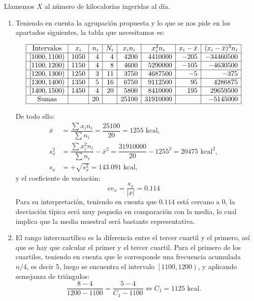 {Llamemos $X$ al número de kilocalorías ingeridas al día.
\begin{enumerate}
\item Teniendo en cuenta la agrupación propuesta y lo que se nos pide en los apartados siguientes, la tabla que necesitamos es:

\[
\begin{array}{|c|r|r|r|r|r|r|r|} \hline
\textrm{Intervalos} & \multicolumn{1}{c|}{x_{i}} & \multicolumn{1}{c|}{n_{i}} &
\multicolumn{1}{c|}{N_{i}} & \multicolumn{1}{c|}{x_{i}n_{i}} &
\multicolumn{1}{c|}{x_{i}^{2}n_{i}} & \multicolumn{1}{c|}{x_{i}-\bar x} &
\multicolumn{1}{c|}{(x_{i}- \bar x)^3n_{i}}
\\ \hline
\left[ 1000,1100\right)  & 1050 & 4 & 4 & 4200 &  4410000 & -205 & -34460500
\\ \hline
\left[ 1100,1200\right)  & 1150 & 4 & 8 & 4600 & 5290000 & -105 & -4630500
\\ \hline
\left[ 1200,1300\right)  & 1250 & 3 & 11 & 3750 & 4687500 & -5 & -375
\\ \hline
\left[ 1300,1400\right)  & 1350 & 5 & 16 & 6750 &  9112500 & 95 & 4286875
\\ \hline
\left[ 1400,1500\right)  & 1450 & 4 & 20 & 5800 &  8410000 & 195 & 29659500
\\ \hline
\textrm{Sumas}&  & 20 &  & 25100 &  31910000 & & -5145000
\\ \hline
\end{array}
\]

De todo ello:
\begin{align*}
\bar x& =\dfrac{\sum x_{i}n_{i}}{\sum n_{i}}=\dfrac{25100}{20}=1255\text{ kcal},\\
s_{x}^{2}& =\dfrac{\sum x_{i}^{2}n_{i}}{\sum n_{i}}-\bar x^{2}=\dfrac{31910000}{20}-1255^{2}=20475\text{ kcal}^{2},\\
s_{x}& =+\sqrt{s_{x}^{2}}=143.091\text{ kcal},
\end{align*}
y el coeficiente de variación:
\[
cv_x=\dfrac{s_{x}}{\left| \overline{x}\right| }=0.114
\]
Para su interpretación, teniendo en cuenta que $0.114$ está cercano a 0, la desviación típica será muy pequeña en comparación con la media,
lo cual implica que la media muestral será bastante representativa.

\item El rango intercuartílico es la diferencia entre el tercer cuartil y el primero, así que se hay que calcular el primer y
el tercer cuartil. Para el primero de los cuartiles, teniendo en cuenta que le corresponde una frecuencia acumulada $n/4$, es decir 5, luego
se encuentra el intervalo $\left[ 1100,1200\right)$, y aplicando semejanza de triángulos:
\[
\dfrac{8-4}{1200-1100}=\dfrac{5-4}{C_{1}-1100} \Leftrightarrow C_{1}=1125\text{ kcal}.
\]


\end{enumerate}}
